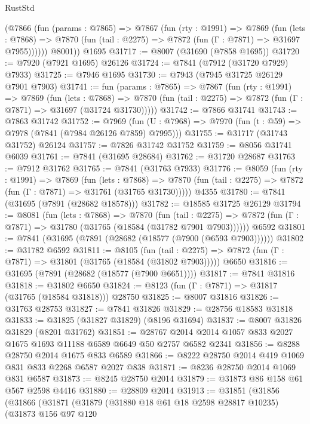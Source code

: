 \begin{lexlean}{RustStd}
\begin{coremodule}
{\begin{coremodule}
{{{{{{{{{{{{{{{{{{{{{{{{{{{{{{{{{{{{{{{{{{{{{{{{{{{{{{        (@7866
          (fun (params : @7865) =>
          @7867
            (fun (rty : @1991) =>
            @7869
              (fun (lets : @7868) =>
              @7870 (fun (tail : @2275) => @7872 (fun (Γ : @7871) => @31697 @7955))))))
        @8001))
    @1695
@31717 := @8007 (@31690 (@7858 @1695))
@31720 := @7920 (@7921 @1695) @26126
@31724 := @7841 (@7912 (@31720 @7929) @7933)
@31725 := @7946 @1695
@31730 := @7943 (@7945 @31725 @26129 @7901 @7903)
@31741 := fun (params : @7865) =>
  @7867
    (fun (rty : @1991) =>
    @7869
      (fun (lets : @7868) =>
      @7870 (fun (tail : @2275) => @7872 (fun (Γ : @7871) => @31697 (@31724 @31730)))))
@31742 := @7866 @31741
@31743 := @7863 @31742
@31752 := @7969
    (fun (U : @7968) => @7970 (fun (t : @59) => @7978 (@7841 (@7984 @26126 @7859) @7995)))
@31755 := @31717 (@31743 @31752) @26124
@31757 := @7826 @31742 @31752
@31759 := @8056 @31741 @6039
@31761 := @7841 (@31695 @28684)
@31762 := @31720 @28687
@31763 := @7912 @31762
@31765 := @7841 (@31763 @7933)
@31776 := @8059
    (fun (rty : @1991) =>
    @7869
      (fun (lets : @7868) =>
      @7870 (fun (tail : @2275) => @7872 (fun (Γ : @7871) => @31761 (@31765 @31730)))))
    @4355
@31780 := @7841 (@31695 (@7891 (@28682 @18578)))
@31782 := @18585 @31725 @26129
@31794 := @8081
    (fun (lets : @7868) =>
    @7870
      (fun (tail : @2275) =>
      @7872 (fun (Γ : @7871) => @31780 (@31765 (@18584 (@31782 @7901 @7903))))))
    @6592
@31801 := @7841 (@31695 (@7891 (@28682 (@18577 (@7900 (@6593 @7903))))))
@31802 := @31782 @6592
@31811 := @8105
    (fun (tail : @2275) => @7872 (fun (Γ : @7871) => @31801 (@31765 (@18584 (@31802 @7903)))))
    @6650
@31816 := @31695 (@7891 (@28682 (@18577 (@7900 @6651))))
@31817 := @7841 @31816
@31818 := @31802 @6650
@31824 := @8123 (fun (Γ : @7871) => @31817 (@31765 (@18584 @31818))) @28750
@31825 := @8007 @31816
@31826 := @31763 @28753
@31827 := @7841 @31826
@31829 := @28756 @18583 @31818
@31833 := @31825 (@31827 @31829) (@8196 @31694)
@31837 := @8007 @31826 @31829 (@8201 @31762)
@31851 := @28767 @2014 @2014 @1057 @833 @2027 @1675 @1693 @11188 @6589 @6649 @50 @2757 @6582 @2341
@31856 := @8288 @28750 @2014 @1675 @833 @6589
@31866 := @8222 @28750 @2014 @419 @1069 @831 @833 @2268 @6587 @2027 @838
@31871 := @8236 @28750 @2014 @1069 @831 @6587
@31873 := @8245 @28750 @2014
@31879 := @31873 @86 @158 @61 @567 @2598 @4416
@31880 := @28809 @2014
@31913 := @31851
    (@31856
      (@31866
        (@31871
          (@31879
            (@31880 @18 @61 @18 @2598 @28817 @10235)
            (@31873
              @156
              @97
              @120
}}}}}}}}}}}}}}}}}}}}}}}}}}}}}}}}}}}}}}}}}}}}}}}}}}}}}}
\end{coremodule}}
\end{coremodule}
\end{lexlean}
